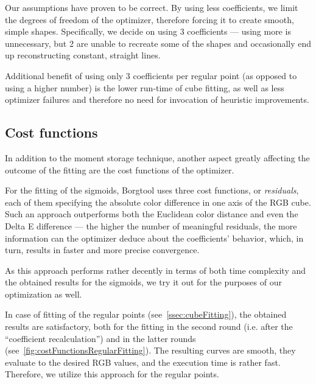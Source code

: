 Our assumptions have proven to be correct. By using less coefficients, we limit the degrees of freedom of the optimizer, therefore forcing it to create smooth, simple shapes. Specifically, we decide on using 3 coefficients --- using more is unnecessary, but 2 are unable to recreate some of the shapes and occasionally end up reconstructing constant, straight lines.

Additional benefit of using only 3 coefficients per regular point (as opposed to using a higher number) is the lower run-time of cube fitting, as well as less optimizer failures and therefore no need for invocation of heuristic improvements.

\subsection{Cost functions} \label{ssec:costFunctions}

In addition to the moment storage technique, another aspect greatly affecting the outcome of the fitting are the cost functions of the optimizer.

For the fitting of the sigmoids, Borgtool uses three cost functions, or \emph{residuals}, each of them specifying the absolute color difference in one axis of the RGB cube. Such an approach outperforms both the Euclidean color distance and even the Delta E difference --- the higher the number of meaningful residuals, the more information can the optimizer deduce about the coefficients' behavior, which, in turn, results in faster and more precise convergence.

As this approach performs rather decently in terms of both time complexity and the obtained results for the sigmoids, we try it out for the purposes of our optimization as well. 

In case of fitting of the regular points (see~\cref{ssec:cubeFitting}), the obtained results are satisfactory, both for the fitting in the second round (i.e. after the ``coefficient recalculation'') and in the latter rounds (see~\cref{fig:costFunctionsRegularFitting}). The resulting curves are smooth, they evaluate to the desired RGB values, and the execution time is rather fast. Therefore, we utilize this approach for the regular points.

